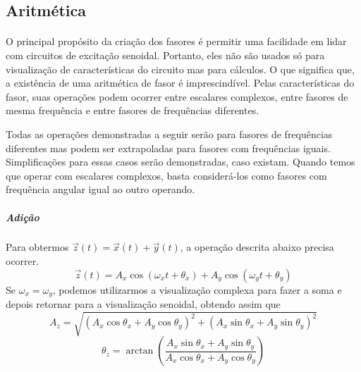 \documentclass[conference,harvard, brazil]{sbatex}
\begin{document}
	\subsection{Aritmética}
	\paragraph{}O principal propósito da criação dos fasores é permitir uma facilidade em lidar com circuitos de excitação senoidal. Portanto, eles não são usados só para visualização de características do circuito mas para cálculos. O que significa que, a existência de uma aritmética de fasor é imprescindível. Pelas características do fasor, suas operações podem ocorrer entre escalares complexos, entre fasores de mesma frequência e entre fasores de frequências diferentes.
	
	Todas as operações demonstradas a seguir serão para fasores de frequências diferentes mas podem ser extrapoladas para fasores com frequências iguais. Simplificações para essas casos serão demonstradas, caso existam. Quando temos que operar com escalares complexos, basta considerá-los como fasores com frequência angular igual ao outro operando.
	
	\subparagraph{Adição}Para obtermos $\overrightarrow{z}(t) = \overrightarrow{x}(t)+\overrightarrow{y}(t)$, a operação descrita abaixo precisa ocorrer.
	\begin{equation*}
		\overrightarrow{z}(t) = A_x\cos(\omega_xt+\theta_x) + A_y\cos(\omega_yt+\theta_y)
	\end{equation*}
	Se $\omega_x=\omega_y$, podemos utilizarmos a visualização complexa para fazer a soma e depois retornar para a visualização senoidal, obtendo assim que
	\begin{equation*}
		A_z=\sqrt{(A_x\cos\theta_x+A_y\cos\theta_y)^2+(A_x\sin\theta_x+A_y\sin\theta_y)^2}
	\end{equation*}
	\begin{equation}
		\theta_z=\arctan\left(\dfrac{A_x\sin\theta_x+A_y\sin\theta_y}{A_x\cos\theta_x+A_y\cos\theta_y}\right)
		\label{eq:add}
	\end{equation}
	
\end{document}
